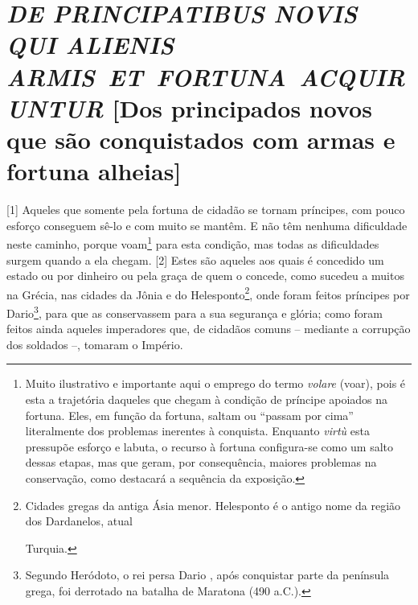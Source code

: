 \quebra\section{\emph{DE PRINCIPATIBUS NOVIS QUI ALIENIS ARMIS~ET~FORTUNA~ACQUIRUNTUR}\break
{[}Dos principados novos que são conquistados com armas e fortuna alheias{]}}

{[}1{]} Aqueles que somente pela fortuna de cidadão se tornam príncipes,
com pouco esforço conseguem sê-lo e com muito se mantêm. E não têm
nenhuma dificuldade neste caminho, porque voam\footnote{Muito
  ilustrativo e importante aqui o emprego do termo \emph{volare} (voar),
  pois é esta a trajetória daqueles que chegam à condição de príncipe
  apoiados na fortuna. Eles, em função da fortuna, saltam ou ``passam
  por cima'' literalmente dos problemas inerentes à conquista. Enquanto
  \emph{virtù} esta pressupõe esforço e labuta, o recurso à fortuna
  configura-se como um salto dessas etapas, mas que geram, por
  consequência, maiores problemas na conservação, como destacará a
  sequência da exposição.} para esta condição, mas todas as dificuldades
surgem quando a ela chegam. {[}2{]} Estes são aqueles aos quais é
concedido um estado ou por dinheiro ou pela graça de quem o concede,
como sucedeu a muitos na Grécia, nas cidades da Jônia e do
Helesponto\footnote{Cidades gregas da antiga Ásia menor. Helesponto é o
  antigo nome da região dos Dardanelos, atual

  Turquia.}, onde foram feitos príncipes por Dario\footnote{Segundo
  Heródoto, o rei persa Dario , após conquistar parte da península
  grega, foi derrotado na batalha de Maratona (490 a.C.).}, para que as
conservassem para a sua segurança e glória; como foram feitos ainda
aqueles imperadores que, de cidadãos comuns -- mediante a corrupção dos
soldados --, tomaram o Império.

